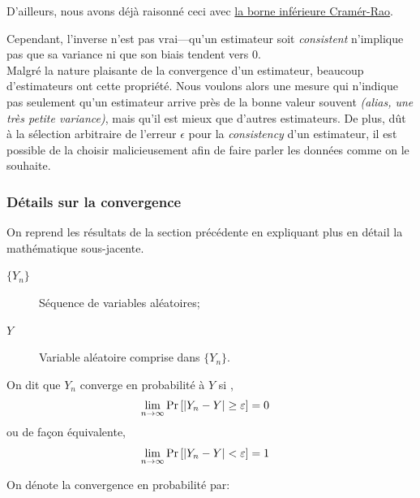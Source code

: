 \documentclass[10pt, french]{article}
\begin{document}
\begin{multicols*}{2}
D'ailleurs, nous avons déjà raisonné ceci avec \hyperlink{cramer-rao}{la borne inférieure Cramér-Rao}.

Cependant, l'inverse n'est pas vrai---qu'un estimateur soit \og \textit{consistent} \fg{} n'implique pas que sa variance ni que son biais tendent vers 0.\\

Malgré la nature plaisante de la convergence d'un estimateur, beaucoup d'estimateurs ont cette propriété. 
Nous voulons alors une mesure qui n'indique pas seulement qu'un estimateur arrive près de la bonne valeur souvent \textit{(alias, une très petite variance)}, mais qu'il est mieux que d'autres estimateurs.
De plus, dût à la sélection arbitraire de l'erreur $\epsilon$ pour la \textit{consistency} d'un estimateur, il est possible de la choisir malicieusement afin de faire parler les données comme on le souhaite. 

\subsubsection*{Détails sur la convergence}
On reprend les résultats de la section précédente en expliquant plus en détail la mathématique sous-jacente.\\

\begin{definitionNOHFILLsub}
\begin{distributions}[Notation]
\begin{description}
	\item[$\{Y_{n}\}$]	Séquence de variables aléatoires;
	\item[$Y$]	Variable aléatoire comprise dans $\{Y_{n}\}$.
\end{description}
\end{distributions}

On dit que $Y_{n}$ converge en probabilité à $Y$ si , 
\begin{align*}
	\underset{n \rightarrow \infty}{\lim} \Pr\left[|Y_{n}	-	Y|	\geq	\varepsilon\right]	
	&=	0
\end{align*}
ou de façon équivalente,
\begin{align*}
	\underset{n \rightarrow \infty}{\lim} \Pr\left[|Y_{n}	-	Y|<	\varepsilon\right]	
	&=	1
\end{align*}

On dénote la convergence en probabilité par: 
\end{definitionNOHFILLsub}


\end{multicols*}
\end{document}
